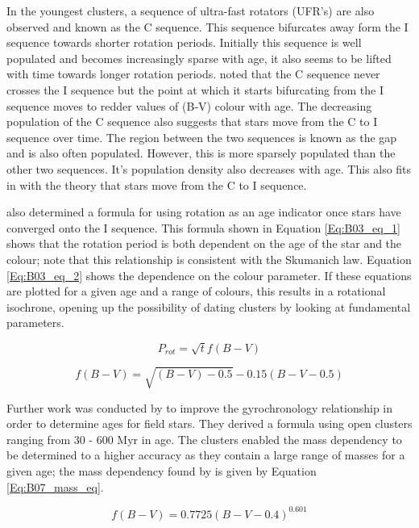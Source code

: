 In the youngest clusters, a sequence of ultra-fast rotators (UFR's) are also observed and known as the C sequence. This sequence bifurcates away form the I sequence towards shorter rotation periods. Initially this sequence is well populated and becomes increasingly sparse with age, it also seems to be lifted with time towards longer rotation periods. \citet{Barnes_2003} noted that the C sequence never crosses the I sequence but the point at which it starts bifurcating from the I sequence moves to redder values of (B-V) colour with age. The decreasing population of the C sequence also suggests that stars move from the C to I sequence over time. The region between the two sequences is known as the gap and is also often populated. However, this is more sparsely populated than the other two sequences. It's population density also decreases with age. This also fits in with the theory that stars move from the C to I sequence.

\citet{Barnes_2003} also determined a formula for using rotation as an age indicator once stars have converged onto the I sequence. This formula shown in Equation \ref{Eq:B03_eq_1} shows that the rotation period is both dependent on the age of the star and the colour; note that this relationship is consistent with the Skumanich law. Equation \ref{Eq:B03_eq_2} shows the dependence on the colour parameter. If these equations are plotted for a given age and a range of colours, this results in a rotational isochrone, opening up the possibility of dating clusters by looking at fundamental parameters.

\begin{equation}
    P_{rot} = \sqrt{t}f(B-V)
    \label{Eq:B03_eq_1}
\end{equation}

\begin{equation}
    f(B-V) = \sqrt{(B-V) -0.5} - 0.15(B-V-0.5)
    \label{Eq:B03_eq_2}
\end{equation}

Further work was conducted by \citet{Barnes_2007} to improve the gyrochronology relationship in order to determine ages for field stars. They derived a formula using open clusters ranging from 30 - 600 Myr in age. The clusters enabled the mass dependency to be determined to a higher accuracy as they contain a large range of masses for a given age; the mass dependency found by \citet{Barnes_2007} is given by Equation \ref{Eq:B07_mass_eq}.

\begin{equation}
    f(B-V) = 0.7725(B-V-0.4)^{0.601}
    \label{Eq:B07_mass_eq}
\end{equation}

